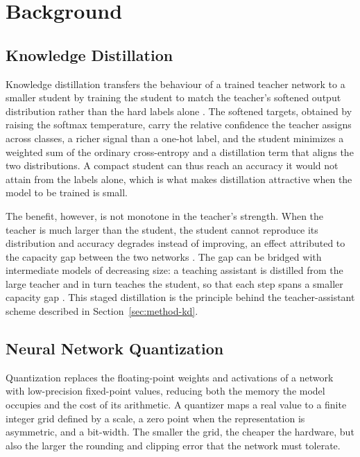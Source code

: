 \section{Background}
\label{sec:background}

\subsection{Knowledge Distillation}
\label{sec:bg-kd}

Knowledge distillation transfers the behaviour of a trained teacher network to a
smaller student by training the student to match the teacher's softened output
distribution rather than the hard labels alone \cite{hinton2015distilling}. The
softened targets, obtained by raising the softmax temperature, carry the relative
confidence the teacher assigns across classes, a richer signal than a one-hot
label, and the student minimizes a weighted sum of the ordinary cross-entropy and
a distillation term that aligns the two distributions. A compact student can thus
reach an accuracy it would not attain from the labels alone, which is what makes
distillation attractive when the model to be trained is small.

The benefit, however, is not monotone in the teacher's strength. When the teacher
is much larger than the student, the student cannot reproduce its distribution and
accuracy degrades instead of improving, an effect attributed to the capacity gap
between the two networks \cite{cho2019efficacy}. The gap can be bridged with
intermediate models of decreasing size: a teaching assistant is distilled from
the large teacher and in turn teaches the student, so that each step spans a
smaller capacity gap \cite{mirzadeh2020takd}. This staged distillation is the
principle behind the teacher-assistant scheme described in
Section~\ref{sec:method-kd}.

\subsection{Neural Network Quantization}
\label{sec:bg-quant}

Quantization replaces the floating-point weights and activations of a network
with low-precision fixed-point values, reducing both the memory the model occupies
and the cost of its arithmetic. A quantizer maps a real value to a finite integer
grid defined by a scale, a zero point when the representation is asymmetric, and a
bit-width. The smaller the grid, the cheaper the hardware, but also the larger the
rounding and clipping error that the network must tolerate.

